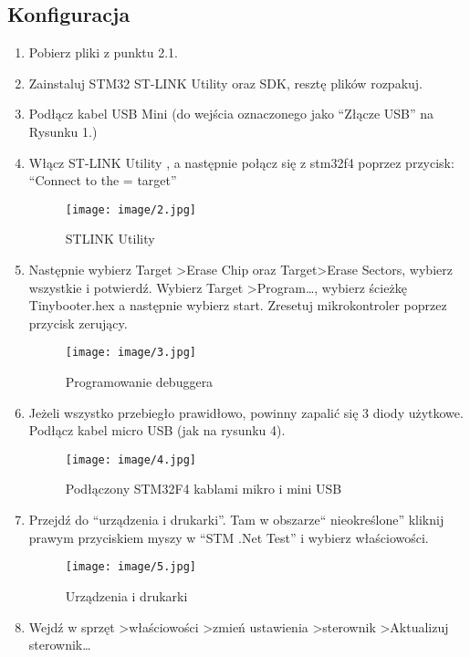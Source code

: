 \documentclass{article}
\begin{document}
\subsection{Konfiguracja}
\begin{enumerate}
\item Pobierz pliki z punktu 2.1.
\item Zainstaluj STM32 ST-LINK Utility oraz SDK, resztę plików rozpakuj.
\item Podłącz kabel USB Mini (do wejścia oznaczonego jako “Złącze USB” na Rysunku 1.)
\item Włącz ST-LINK Utility , a następnie połącz się z stm32f4 poprzez przycisk: “Connect to the = target”

\begin{figure}[H]
\texttt{[image: image/2.jpg]}
\caption{STLINK Utility}
\end{figure}

\item Następnie wybierz Target \textgreater Erase Chip oraz Target\textgreater Erase Sectors, wybierz wszystkie i potwierdź. Wybierz Target \textgreater Program…, wybierz ścieżkę Tinybooter.hex a następnie wybierz start. Zresetuj mikrokontroler poprzez przycisk zerujący.

\begin{figure}[H]
\texttt{[image: image/3.jpg]}
\caption{Programowanie debuggera}
\end{figure}

\item Jeżeli wszystko przebiegło prawidłowo, powinny zapalić się 3 diody użytkowe. Podłącz kabel micro USB (jak na rysunku 4).

\begin{figure}[H]
\texttt{[image: image/4.jpg]}
\caption{Podłączony STM32F4 kablami mikro i mini USB}
\end{figure}

\item Przejdź do “urządzenia i drukarki”. Tam w obszarze“ nieokreślone” kliknij prawym przyciskiem myszy w “STM .Net Test” i wybierz właściowości.

\begin{figure}[H]
\texttt{[image: image/5.jpg]}
\caption{Urządzenia i drukarki}
\end{figure}

\item Wejdź w sprzęt \textgreater właściowości \textgreater zmień ustawienia \textgreater sterownik \textgreater Aktualizuj sterownik…


\end{enumerate}
\end{document}
